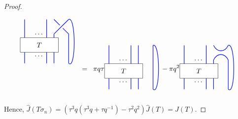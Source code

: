 \documentclass{amsart}
\newcommand{\hackcenter}[1]{
 \xy (0,0)*{#1}; \endxy}
\theoremstyle{plain}
\theoremstyle{definition}
\theoremstyle{definition}
\numberwithin{equation}{section}
\numberwithin{theorem}{section}
\numberwithin{equation}{section}
\let\hat=\widehat
\begin{document}
\begin{proof}
\[{\begin{tikzpicture} [scale=0.75]
\draw[thick,  blue] (.5,-.5) to (.5,2.5);
\draw[thick,  blue] (-1,-.5) to (-1,2.5);
\draw[thick,  blue] (1,-.5) to (1,1.5);
\draw[fill=white!20,] (-1.3,.25) rectangle (1.3,1.25);
\node at (0,0) {$\dots$};
\node at (0,1.5) {$\dots$};
 \node at (0,.75) {$T$};
 \draw[thick,   blue] (1,1.5) to (2,2.5);
\draw[thick,   blue] (2,1.5) to (1.6,1.9);
\draw[thick,   blue] (1,2.5) to (1.4,2.1);
\draw[thick,blue] (2,1.5) to (2,-.5);
\draw[thick, blue] (2,2.5) .. controls ++(.5,.25) and ++(.5, -.5) ..(2,-.5);
\end{tikzpicture}}
\;\;=\;\;\pi q
\tau
\hackcenter{\begin{tikzpicture} [scale=0.75]
\draw[thick,  blue] (.5,-.5) to (.5,2.5);
\draw[thick,  blue] (-1,-.5) to (-1,2.5);
\draw[thick,  blue] (1,-.5) to (1,2.5);
\draw[fill=white!20,] (-1.3,.25) rectangle (1.3,1.25);
\node at (0,0) {$\dots$};
\node at (0,1.5) {$\dots$};
 \node at (0,.75) {$T$};
\draw[thick,blue] (2,2.5) to (2,-.5);
\draw[thick, blue] (2,2.5) .. controls ++(.5,.25) and ++(.5, -.5) ..(2,-.5);
\end{tikzpicture}}
-\pi q^2
\hackcenter{\begin{tikzpicture} [scale=0.75]
\draw[thick,  blue] (.5,-.5) to (.5,2.5);
\draw[thick,  blue] (-1,-.5) to (-1,2.5);
\draw[thick,  blue] (1,-.5) to (1,1.5);
\draw[fill=white!20,] (-1.3,.25) rectangle (1.3,1.25);
\node at (0,0) {$\dots$};
\node at (0,1.5) {$\dots$};
 \node at (0,.75) {$T$};
\draw[thick,   blue] (1,1.5).. controls ++(.25,.5) and ++(-.25,.5).. (2,1.5);
\draw[thick,   blue] (1,2.5).. controls ++(.25,-.5) and ++(-.25,-.5).. (2,2.5);
\draw[thick,blue] (2,1.5) to (2,-.5);
\draw[thick, blue] (2,2.5) .. controls ++(.5,.25) and ++(.5, -.5) ..(2,-.5);
\end{tikzpicture}}
\]

Hence, $\hat{J}(T\sigma_n)=(\tau^3q(\tau^3 q+\tau q^{-1})-\tau^2q^2)\hat{J}(T)=\hat{J}(T)$.
\end{proof}
\end{document}
